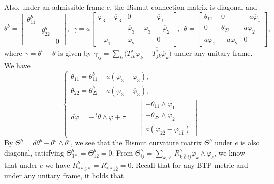 \documentclass{amsart}
\numberwithin{equation}{section}
\theoremstyle{definition}
\renewcommand{\1}{\mathds{1}}
\renewcommand{\>}{\rightarrow}
\begin{document}
Also, under an admissible frame $e$, the Bismut connection matrix is diagonal and
\begin{equation} \label{eq:9.1b}
 \theta^b = \left[ \begin{array}{ccc} \theta^b_{11} & & \\ & \theta^b_{22} & \\ & & 0 \end{array} \right]\!\!,  \ \
 \gamma = a \!\left[ \begin{array}{ccc} \varphi_3\!-\!\overline{\varphi}_3 & 0 & \overline{\varphi}_1 \\
 & \overline{\varphi}_3\!-\!\varphi_3 & -\overline{\varphi}_2 \\
 -\varphi_1 & \varphi_2 & 0 \end{array} \right]\!\!, \ \
 \theta = \left[ \begin{array}{ccc} \theta_{11} & 0 & -a\overline{\varphi}_1 \\
0 & \theta_{22} & a\overline{\varphi}_2\\
a\varphi_1& -a\varphi_2 & 0 \end{array} \right]\!\!,
\end{equation}
where $\gamma = \theta^b-\theta$ is given by $\gamma_{ij} = \sum_k \big( T^j_{ik} \varphi_k - \overline{T^i_{jk}} \overline{\varphi}_k \big)$ under any unitary frame. We have
 \begin{equation} \label{eq:9.2c}
   \begin{cases}
   \theta_{11} =\theta^b_{11} - a(\varphi_3 - \overline{\varphi}_3), \\
   \theta_{22}  =\theta^b_{22} + a(\varphi_3 - \overline{\varphi}_3), \\
     d\varphi = -\,^t\!\theta \wedge \varphi + \tau \ = \ \left[ \begin{array}{c} -\theta_{11}\wedge \varphi_1 \\  -\theta_{22}\wedge \varphi_2 \\
     a (\varphi_{2\bar{2}}-\varphi_{1\bar{1}}) \end{array} \right] .
     \end{cases}
     \end{equation}
By $\Theta^b=d\theta^b-\theta^b \wedge \theta^b$, we see that the Bismut curvature matrix $\Theta^b$ under $e$ is also diagonal, satisfying $\Theta^b_{3\ast}=\Theta^b_{12}=0$. From $\Theta^b_{ij}=\sum_{k,\ell} R^b_{k\bar{\ell}i\bar{j}}\varphi_k\wedge \overline{\varphi}_{\ell}$, we know that under $e$ we have
$ R^b_{\ast \bar{\ast} 3\bar{\ast}} = R^b_{\ast \bar{\ast} 1\bar{2}} =0$. Recall that for any BTP metric and under any unitary frame, it holds that
\end{document}
